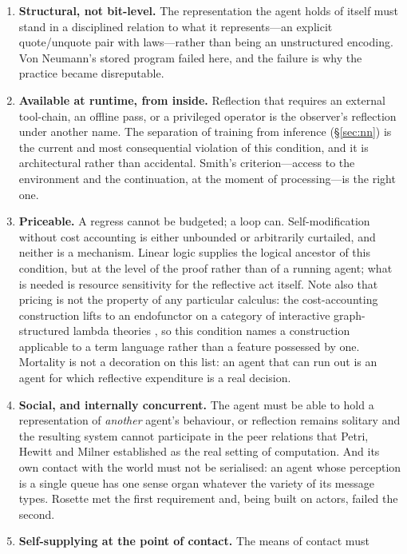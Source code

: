 \documentclass[11pt,a4paper]{article}
\begin{document}
\begin{enumerate}[label=\textbf{C\arabic*.},leftmargin=2.6em,itemsep=0.25em]
\item \textbf{Structural, not bit-level.} The representation the agent holds of
itself must stand in a disciplined relation to what it represents---an explicit
quote/unquote pair with laws---rather than being an unstructured encoding.
Von Neumann's stored program failed here, and the failure is why the practice
became disreputable.
\item \textbf{Available at runtime, from inside.} Reflection that requires an
external tool-chain, an offline pass, or a privileged operator is the observer's
reflection under another name. The separation of training from inference
(\S\ref{sec:nn}) is the current and most consequential violation of this
condition, and it is architectural rather than accidental. Smith's criterion---access to the environment and
the continuation, at the moment of processing---is the right one.
\item \textbf{Priceable.} A regress cannot be budgeted; a loop can. Self-modification
without cost accounting is either unbounded or arbitrarily curtailed, and neither
is a mechanism. Linear logic supplies the logical ancestor of this condition, but
at the level of the proof rather than of a running agent; what is needed is
resource sensitivity for the reflective act itself. Note also that pricing is not
the property of any particular calculus: the cost-accounting construction lifts
to an endofunctor on a category of interactive graph-structured lambda theories
\cite{meredithcost}, so this condition names a construction applicable to a term
language rather than a feature possessed by one. Mortality is not a decoration on this list: an agent that can run
out is an agent for which reflective expenditure is a real decision.
\item \textbf{Social, and internally concurrent.} The agent must be able to hold
a representation of \emph{another} agent's behaviour, or reflection remains
solitary and the resulting system cannot participate in the peer relations that
Petri, Hewitt and Milner established as the real setting of computation. And its
own contact with the world must not be serialised: an agent whose perception is a
single queue has one sense organ whatever the variety of its message types.
Rosette met the first requirement and, being built on actors, failed the second.
\item \textbf{Self-supplying at the point of contact.} The means of contact must

\end{enumerate}
\end{document}
